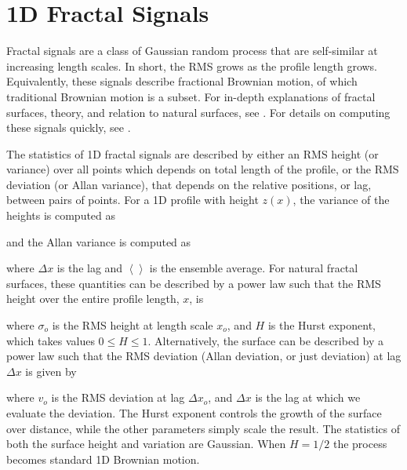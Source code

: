 \clearpage
{\footnotesize
{}
}


\clearpage
\newpage

\section{1D Fractal Signals}

Fractal signals are a class of Gaussian random process that are self-similar at increasing length scales. In short, the RMS grows as the profile length grows. Equivalently, these signals describe fractional Brownian motion, of which traditional Brownian motion is a subset. For in-depth explanations of fractal surfaces, theory, and relation to natural surfaces, see \cite{shepard1995self,shepard1999radar}. For details on computing these signals quickly, see \cite{kroese2015spatial}.  

The statistics of 1D fractal signals are described by either an RMS height (or variance) over all points which depends on total length of the profile, or the RMS deviation (or Allan variance), that depends on the relative positions, or lag, between pairs of points. For a 1D profile with height $z(x)$, the variance of the heights is computed as 

and the Allan variance is computed as

\noindent where $ \Delta x$ is the lag and $\left< \right>$ is the ensemble average.  For natural fractal surfaces, these quantities can be described by a power law such that the RMS height over the entire profile length, $x$, is

\noindent where $\sigma_o$ is the RMS height at length scale $x_o$, and $H$ is the Hurst exponent, which takes values $0 \le H \le 1$. Alternatively, the surface can be described by a power law such that the RMS deviation (Allan deviation, or just deviation) at lag $\Delta x$ is given by

\noindent where $v_o$ is the RMS deviation at lag $\Delta x_o$, and $\Delta x$ is the lag at which we evaluate the deviation. The Hurst exponent controls the growth of the surface over distance, while the other parameters simply scale the result. The statistics of both the surface height and variation are Gaussian. When $H=1/2$ the process becomes standard 1D Brownian motion.

